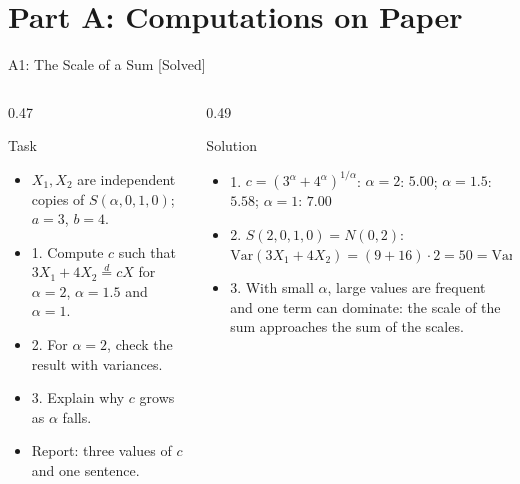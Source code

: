 \section{Part A: Computations on Paper}

\begin{frame}{A1: The Scale of a Sum [Solved]}
\itemsize{\footnotesize}
\begin{columns}[T]
\begin{column}{0.47\textwidth}
\begin{block}{Task}
\begin{itemize}
    \item $X_1, X_2$ are independent copies of $S(\alpha, 0, 1, 0)$; $a = 3$, $b = 4$.
    \item 1. Compute $c$ such that $3X_1 + 4X_2 \overset{d}{=} cX$ for $\alpha = 2$, $\alpha = 1.5$ and $\alpha = 1$.
    \item 2. For $\alpha = 2$, check the result with variances.
    \item 3. Explain why $c$ grows as $\alpha$ falls.
    \item Report: three values of $c$ and one sentence.
\end{itemize}
\end{block}
\end{column}
\begin{column}{0.49\textwidth}
\begin{exampleblock}{Solution}
\begin{itemize}
    \item 1. $c = (3^\alpha + 4^\alpha)^{1/\alpha}$: $\alpha = 2$: $5.00$; $\alpha = 1.5$: $5.58$; $\alpha = 1$: $7.00$
    \item 2. $S(2, 0, 1, 0) = N(0, 2)$: $\mathrm{Var}(3X_1 + 4X_2) = (9 + 16) \cdot 2 = 50 = \mathrm{Var}(5X)$
    \item 3. With small $\alpha$, large values are frequent and one term can dominate: the scale of the sum approaches the sum of the scales.
\end{itemize}
\end{exampleblock}
\end{column}
\end{columns}
\end{frame}

